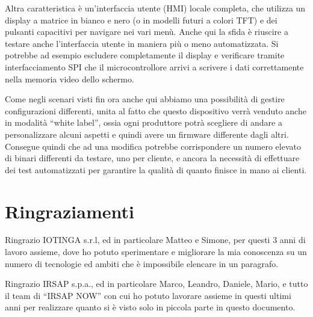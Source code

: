 \documentclass[12pt,a4paper,twoside,titlepage]{book}
\begin{document}
Altra caratteristica è un'interfaccia utente (HMI)
locale completa, che utilizza un display a matrice in bianco e nero (o in modelli
futuri a colori TFT) e dei pulsanti capacitivi per navigare nei vari menù. Anche
qui la sfida è riuscire a testare anche l'interfaccia utente in maniera più o meno
automatizzata. Si potrebbe ad esempio escludere completamente il display e verificare
tramite interfacciamento SPI che il microcontrollore arrivi a scrivere i dati correttamente
nella memoria video dello schermo.

Come negli scenari visti fin ora anche qui abbiamo una possibilità di gestire configurazioni
differenti, unita al fatto che questo dispositivo verrà venduto anche in modalità ``white label'',
ossia ogni produttore potrà scegliere di andare a personalizzare alcuni aspetti e quindi
avere un firmware differente dagli altri. Consegue quindi che ad una modifica potrebbe
corrispondere un numero elevato di binari differenti da testare, uno per cliente, e
ancora la necessità di effettuare dei test automatizzati per garantire la qualità di
quanto finisce in mano ai clienti.

\section{Ringraziamenti}

Ringrazio IOTINGA s.r.l, ed in particolare Matteo e Simone, per questi 3 anni di
lavoro assieme, dove ho potuto sperimentare e migliorare la mia conoscenza su un
numero di tecnologie ed ambiti che è impossibile elencare in un paragrafo.

Ringrazio IRSAP s.p.a., ed in particolare Marco, Leandro, Daniele, Mario, e tutto il team
di ``IRSAP NOW'' con cui ho potuto lavorare assieme in questi ultimi anni per realizzare
quanto si è visto solo in piccola parte in questo documento.
\end{document}
